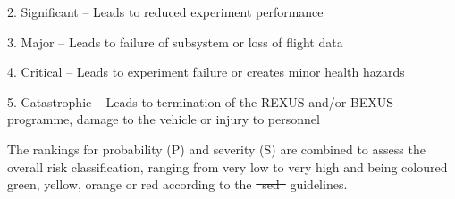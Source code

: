 \documentclass[ %
  a4paper, %
  11pt, %
  openany, %
  parskip, %
  toc=totoc, %
  listof=totoc, %
  bibliography=totoc %
]{scrreprt} %
\makeatletter
\providecommand{\DIFaddtex}[1]{{\protect\color{blue}\uwave{#1}}} %
\providecommand{\DIFdeltex}[1]{{\protect\color{red}\sout{#1}}} %
\providecommand{\DIFaddbegin}{} %
\providecommand{\DIFaddend}{} %
\providecommand{\DIFdelbegin}{} %
\providecommand{\DIFdelend}{} %
\providecommand{\DIFadd}[1]{\texorpdfstring{\DIFaddtex{#1}}{#1}} %
\providecommand{\DIFdel}[1]{\texorpdfstring{\DIFdeltex{#1}}{}} %
\let\sout@orig\sout %
\renewcommand{\sout}[1]{\ifmmode\text{\sout@orig{\ensuremath{#1}}}\else\sout@orig{#1}\fi} %
\makeatother
\begin{document}
2. Significant -- Leads to reduced experiment performance

3. Major -- Leads to failure of subsystem or loss of flight data

4. Critical -- Leads to experiment failure or creates minor health hazards

5. Catastrophic -- Leads to termination of the REXUS and/or BEXUS programme, damage to the vehicle or injury to personnel

The rankings for probability (P) and severity (S) are combined to assess the overall risk classification, ranging from very low to very high and being coloured green, yellow, orange or red according to the \DIFdelbegin \DIFdel{\mbox{%
\ac{sed} }\hskip0pt%
}\DIFdelend \DIFaddbegin \DIFadd{\mbox{%
\gls{sed} }\hskip0pt%
}\DIFaddend guidelines.
\end{document}
